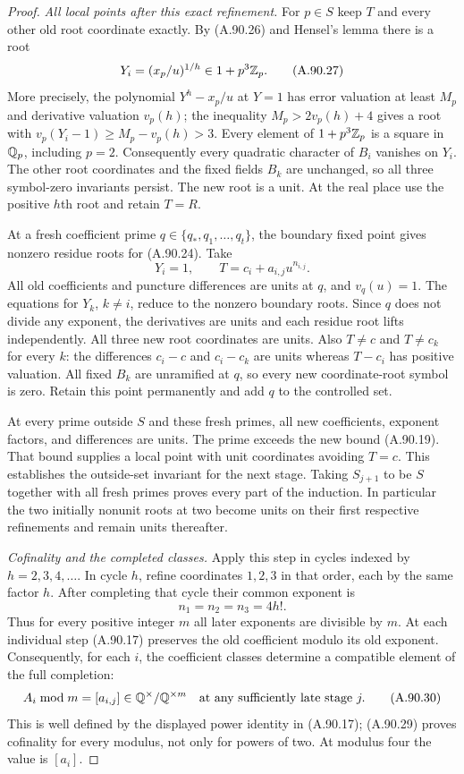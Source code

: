 \begin{proof}
\emph{All local points after this exact refinement.}
For $p\in S$ keep $T$ and every other old root
coordinate exactly.
By (A.90.26) and Hensel's lemma there is a root
\[
                    Y_i=(x_p/u)^{1/h}\in1+p^3\mathbb Z_p .
 \tag{A.90.27}
\]
More precisely, the polynomial $Y^h-x_p/u$
at $Y=1$ has error valuation at least $M_p$
and derivative valuation $v_p(h)$;
the inequality $M_p>2v_p(h)+4$ gives a root
with $v_p(Y_i-1)\ge M_p-v_p(h)>3$.
Every element of $1+p^3\mathbb Z_p$ is a square in
$\mathbb Q_p$, including $p=2$.
Consequently every quadratic character of
$B_i$ vanishes on $Y_i$.
The other root coordinates and the fixed
fields $B_k$ are unchanged, so all three
symbol-zero invariants persist.
The new root is a unit.
At the real place use the positive $h$th root
and retain $T=R$.

At a fresh coefficient prime
$q\in\{q_*,q_1,\ldots,q_t\}$, the boundary
fixed point gives nonzero residue roots for
(A.90.24).
Take
\[
                       Y_i=1,\qquad
                       T=c_i+a_{i,j}u^{n_{i,j}} .
 \tag{A.90.28}
\]
All old coefficients and puncture differences
are units at $q$, and $v_q(u)=1$.
The equations for $Y_k$, $k\ne i$, reduce to
the nonzero boundary roots.
Since $q$ does not divide any exponent, the
derivatives are units and each residue root
lifts independently.
All three new root coordinates are units.
Also $T\ne c$ and $T\ne c_k$ for every $k$:
the differences $c_i-c$ and $c_i-c_k$ are units
whereas $T-c_i$ has positive valuation.
All fixed $B_k$ are unramified at $q$, so every
new coordinate-root symbol is zero.
Retain this point permanently and add $q$ to
the controlled set.

At every prime outside $S$ and these fresh
primes, all new coefficients, exponent factors,
and differences are units.
The prime exceeds the new bound (A.90.19).
That bound supplies a local point with unit
coordinates avoiding $T=c$.
This establishes the outside-set invariant
for the next stage.
Taking $S_{j+1}$ to be $S$ together with all
fresh primes proves every part of the
induction.
In particular the two initially nonunit roots
at two become units on their first respective
refinements and remain units thereafter.

\emph{Cofinality and the completed classes.}
Apply this step in cycles indexed by
$h=2,3,4,\ldots$.
In cycle $h$, refine coordinates $1,2,3$ in
that order, each by the same factor $h$.
After completing that cycle their common
exponent is
\[
                              n_1=n_2=n_3=4h! .
 \tag{A.90.29}
\]
Thus for every positive integer $m$ all later
exponents are divisible by $m$.
At each individual step (A.90.17) preserves the
old coefficient modulo its old exponent.
Consequently, for each $i$, the coefficient
classes determine a compatible element of
the full completion:
\[
       A_i\bmod m=[a_{i,j}]\in\mathbb Q^\times/\mathbb Q^{\times m}
          \quad\text{at any sufficiently late stage }j .
 \tag{A.90.30}
\]
This is well defined by the displayed power
identity in (A.90.17); (A.90.29) proves
cofinality for every modulus, not only for
powers of two.
At modulus four the value is $[a_i]$.


\end{proof}
